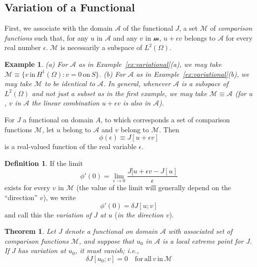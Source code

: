 \documentclass[11pt]{book}
\theoremstyle{example}
\newtheorem{example}{Example}[chapter]
\theoremstyle{problem}
\theoremstyle{theorem}
\newtheorem{theorem}{Theorem}[chapter]
\theoremstyle{definition}
\newtheorem*{definition}{Definition}
\begin{document}
\subsection{Variation of a Functional}
First, we associate with the domain $\mathscr{A}$ of the functional $J$, a set $\mathscr{M}$ of \emph{comparison functions} such that, for any $u$ in $\mathscr{A}$ and any $v$ in $\mathscr{m}$, $u+{\epsilon}v$ belongs to $\mathscr{A}$ for every real number $\epsilon$. $\mathscr{M}$ is necessarily a subspace of $L^2(\Omega)$.
\begin{example}
	(a) For $\mathscr{A}$ as in Example~\ref{ex:variational}(a), we may take $\mathscr{M}\equiv\{v\,\mathrm{in}\,H^1(\Omega):v=0\,\mathrm{on}\,S\}$. (b) For $\mathscr{A}$ as in Example~\ref{ex:variational}(b), we may take $\mathscr{M}$ to be identical to $\mathscr{A}$. In general, whenever $\mathscr{A}$ is a \emph{subspace} of $L^2(\Omega)$ and not just a subset as in the first example, we may take $\mathscr{M}\equiv\mathscr{A}$ (for $u$, $v$ in $\mathscr{A}$ the linear combination $u+{\epsilon}v$ is also in $\mathscr{A}$).
\end{example}
For $J$ a functional on domain $A$, to which corresponds a set of comparison functions $\mathscr{M}$, let $u$ belong to $\mathscr{A}$ and $v$ belong to $\mathscr{M}$. Then
\begin{equation}
	\phi(\epsilon)\equiv{J}[u+{\epsilon}v]
\end{equation}
is a real-valued function of the real variable $\epsilon$.
\begin{definition}
	If the limit
	\begin{equation}
		\phi'(0)=\lim\limits_{\epsilon\rightarrow0}\frac{J[u+{\epsilon}v-J[u]}{\epsilon}
	\end{equation}
	exists for every $v$ in $\mathscr{M}$ (the value of the limit will generally depend on the ``direction'' $v$), we write
	\begin{equation}
		\phi'(0)={\delta}J[u;v]
	\end{equation}
	and call this the \emph{variation of $J$ at $u$} (\emph{in the direction $v$}).
\end{definition}
\begin{theorem}\label{thm:variation}
	Let $J$ denote a functional on domain $\mathscr{A}$ with associated set of comparison functions $\mathscr{M}$, and suppose that $u_0$ in $\mathscr{A}$ is a local extreme point for $J$. If $J$ has variation at $u_0$, it must vanish; i.e.,
	\begin{equation}
		{\delta}J[u_0;v]=0\quad\mathrm{for\,all}\,v\,\mathrm{in}\,\mathscr{M}
	\end{equation}
\end{theorem}
\end{document}
